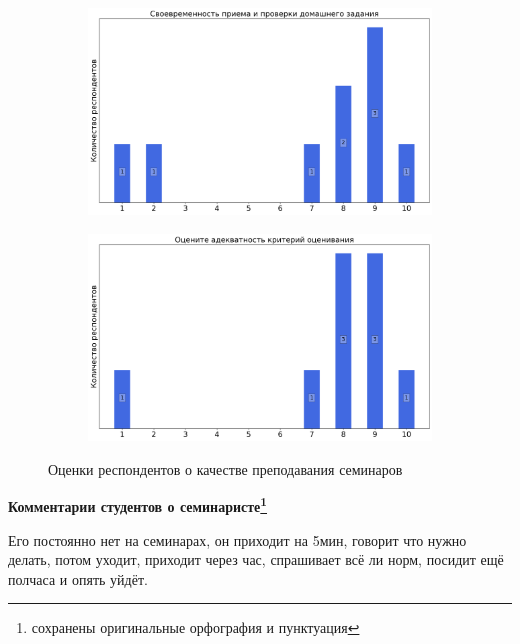 \begin{figure}[H]
\begin{subfigure}[b]{0.45\textwidth}
                \includegraphics[width=\textwidth]{images/1 course/Информатика/seminarists-marks-Кулиев Р.С.-2.png}
            \end{subfigure}
            \begin{subfigure}[b]{0.45\textwidth}
                \centering
                \includegraphics[width=\textwidth]{images/1 course/Информатика/seminarists-marks-Кулиев Р.С.-3.png}
            \end{subfigure}	
            \caption{Оценки респондентов о качестве преподавания семинаров}
        \end{figure}

        \textbf{Комментарии студентов о семинаристе\protect\footnote{сохранены оригинальные орфография и пунктуация}}
            \begin{commentbox} 
                Его постоянно нет на семинарах, он приходит на 5мин, говорит что нужно делать, потом уходит, приходит через час, спрашивает всё ли норм, посидит ещё полчаса и опять уйдёт.   
            \end{commentbox} 

